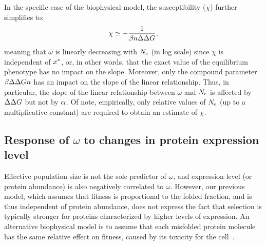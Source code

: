 In the specific case of the biophysical model, the susceptibility ($\chi$) further simplifies to:
\begin{gather}
    \chi \simeq -\dfrac{1}{\beta \NbrSites \DeltaDeltaG}, \label{eq:chi_application}
\end{gather}
meaning that $\omega$ is linearly decreasing with $N_{\text{e}}$ (in log scale) since $\chi$ is independent of $x^{*}$, or, in other words, that the exact value of the equilibrium \gls{phenotype} has no impact on the slope.
Moreover, only the compound parameter $\beta \Delta \Delta G n$ has an impact on the slope of the linear relationship.
Thus, in particular, the slope of the linear relationship between $\omega$ and $N_{\text{e}}$ is affected by $\Delta \Delta G$ but not by $\alpha$.
Of note, empirically, only relative values of $N_{\text{e}}$ (up to a multiplicative constant) are required to obtain an estimate of $\chi$.

\subsection{Response of \texorpdfstring{$\omega$}{ω} to changes in protein expression level}
\label{sec:expression}

Effective population size is not the sole predictor of $\omega$, and expression level (or protein abundance) is also negatively correlated to $\omega$.
However, our previous model, which assumes that fitness is proportional to the folded fraction, and is thus independent of protein abundance, does not express the fact that selection is typically stronger for proteins characterized by higher levels of expression.
An alternative biophysical model is to assume that each misfolded protein molecule has the same relative effect on fitness, caused by its toxicity for the cell~\citep{Drummond2005a, Wilke2006, Drummond2008, Serohijos2012}.

